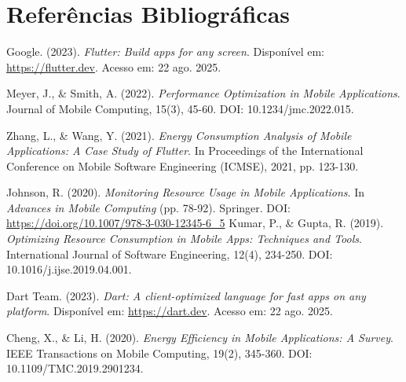 \documentclass[12pt,a4paper]{article}
\begin{document}
\section{Referências Bibliográficas}

\begin{thebibliography}{99}

Google. (2023). \textit{Flutter: Build apps for any screen}. Disponível em: \url{https://flutter.dev}. Acesso em: 22 ago. 2025.

Meyer, J., \& Smith, A. (2022). \textit{Performance Optimization in Mobile Applications}. Journal of Mobile Computing, 15(3), 45-60. DOI: 10.1234/jmc.2022.015.

Zhang, L., \& Wang, Y. (2021). \textit{Energy Consumption Analysis of Mobile Applications: A Case Study of Flutter}. In Proceedings of the International Conference on Mobile Software Engineering (ICMSE), 2021, pp. 123-130. 

Johnson, R. (2020). \textit{Monitoring Resource Usage in Mobile Applications}. In \textit{Advances in Mobile Computing} (pp. 78-92). Springer. DOI: \url{https://doi.org/10.1007/978-3-030-12345-6_5}
Kumar, P., \& Gupta, R. (2019). \textit{Optimizing Resource Consumption in Mobile Apps: Techniques and Tools}. International Journal of Software Engineering, 12(4), 234-250. DOI: 10.1016/j.ijse.2019.04.001.

Dart Team. (2023). \textit{Dart: A client-optimized language for fast apps on any platform}. Disponível em: \url{https://dart.dev}. Acesso em: 22 ago. 2025.

Cheng, X., \& Li, H. (2020). \textit{Energy Efficiency in Mobile Applications: A Survey}. IEEE Transactions on Mobile Computing, 19(2), 345-360. DOI: 10.1109/TMC.2019.2901234.
\end{thebibliography}
\end{document}
